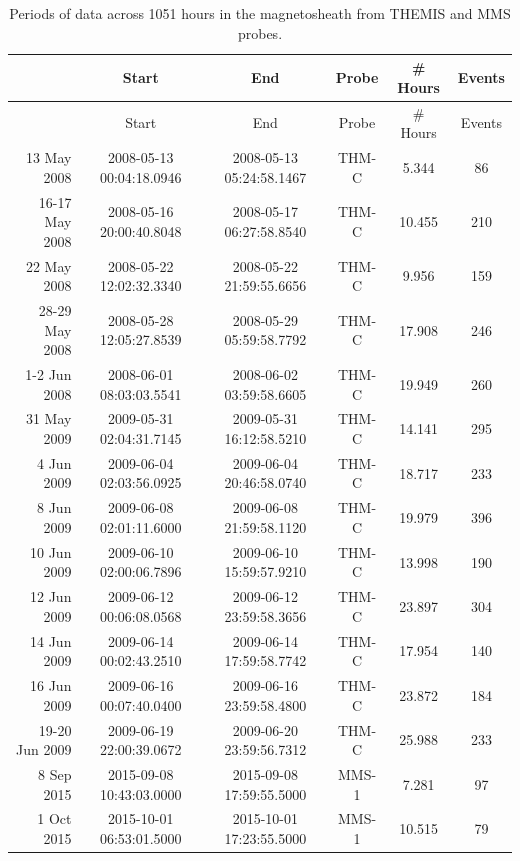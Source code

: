 \begin{longtable}{r|ccccc}
\caption{Periods of data across 1051 hours in the magnetosheath from THEMIS and MMS probes.} \\
\hline
            {} &                     Start &                       End &  Probe &  \# Hours & Events \\
\hline
\endfirsthead
\hline
            {} &                     Start &                       End &  Probe &  \# Hours & Events \\
\hline
\endhead
13 May 2008    &  2008-05-13 00:04:18.0946 &  2008-05-13 05:24:58.1467 &  THM-C &    5.344 &     86 \\
16-17 May 2008 &  2008-05-16 20:00:40.8048 &  2008-05-17 06:27:58.8540 &  THM-C &   10.455 &    210 \\
22 May 2008    &  2008-05-22 12:02:32.3340 &  2008-05-22 21:59:55.6656 &  THM-C &    9.956 &    159 \\
28-29 May 2008 &  2008-05-28 12:05:27.8539 &  2008-05-29 05:59:58.7792 &  THM-C &   17.908 &    246 \\
1-2 Jun 2008   &  2008-06-01 08:03:03.5541 &  2008-06-02 03:59:58.6605 &  THM-C &   19.949 &    260 \\
31 May 2009    &  2009-05-31 02:04:31.7145 &  2009-05-31 16:12:58.5210 &  THM-C &   14.141 &    295 \\
4 Jun 2009     &  2009-06-04 02:03:56.0925 &  2009-06-04 20:46:58.0740 &  THM-C &   18.717 &    233 \\
8 Jun 2009     &  2009-06-08 02:01:11.6000 &  2009-06-08 21:59:58.1120 &  THM-C &   19.979 &    396 \\
10 Jun 2009    &  2009-06-10 02:00:06.7896 &  2009-06-10 15:59:57.9210 &  THM-C &   13.998 &    190 \\
12 Jun 2009    &  2009-06-12 00:06:08.0568 &  2009-06-12 23:59:58.3656 &  THM-C &   23.897 &    304 \\
14 Jun 2009    &  2009-06-14 00:02:43.2510 &  2009-06-14 17:59:58.7742 &  THM-C &   17.954 &    140 \\
16 Jun 2009    &  2009-06-16 00:07:40.0400 &  2009-06-16 23:59:58.4800 &  THM-C &   23.872 &    184 \\
19-20 Jun 2009 &  2009-06-19 22:00:39.0672 &  2009-06-20 23:59:56.7312 &  THM-C &   25.988 &    233 \\
8 Sep 2015     &  2015-09-08 10:43:03.0000 &  2015-09-08 17:59:55.5000 &  MMS-1 &    7.281 &     97 \\
1 Oct 2015     &  2015-10-01 06:53:01.5000 &  2015-10-01 17:23:55.5000 &  MMS-1 &   10.515 &     79 \\

\end{longtable}
